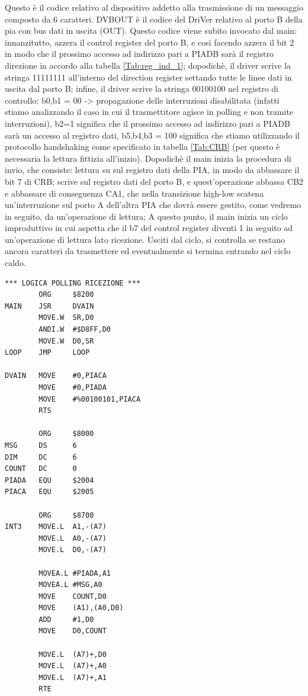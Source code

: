 Questo è il codice relativo al dispositivo addetto alla trasmissione di un messaggio composto da 6 caratteri. 
DVBOUT è il codice del DriVer relativo al porto B della pia con bus dati in uscita (OUT). Questo codice viene subito invocato dal main: innanzitutto, azzera il control register del porto B, e così facendo azzera il bit 2 in modo che il prossimo accesso ad indirizzo pari a PIADB sarà il registro direzione in accordo alla tabella \ref{Tab:reg_ind_1}; dopodichè, il driver scrive la stringa 11111111 all'interno del direction register settando tutte le linee dati in uscita dal porto B; infine, il driver scrive la stringa 00100100 nel registro di controllo: b0,b1 = 00 -> propagazione delle interruzioni disabilitata (infatti stiamo analizzando il caso in cui il trasmettitore agisce in polling e non tramite interruzioni), b2=1 significa che il prossimo accesso ad indirizzo pari a PIADB sarà un accesso al registro dati, b5,b4,b3 = 100 significa che stiamo utilizzando il protocollo handshaking come specificato in tabella \ref{Tab:CRB} (per questo è necessaria la lettura fittizia all'inizio).
Dopodichè il main inizia la procedura di invio, che consiste:
lettura su sul registro dati della PIA, in modo da abbassare il bit 7 di CRB; scrive sul registro dati del porto B, e quest'operazione abbassa CB2 e abbassare di conseguenza CA1, che nella transizione high-low scatena un'interruzione sul porto A dell'altra PIA che dovrà essere gestito, come vedremo in seguito, da un'operazione di lettura; A questo punto, il main inizia un ciclo improduttivo in cui aspetta che il b7 del control register diventi 1 in seguito ad un'operazione di lettura lato ricezione. 
Usciti dal ciclo, si controlla se restano ancora caratteri da trasmettere ed eventualmente si termina entrando nel ciclo caldo. 

\begin{lstlisting}
*** LOGICA POLLING RICEZIONE *** 
        ORG     $8200
MAIN    JSR     DVAIN 
        MOVE.W  SR,D0
        ANDI.W  #$D8FF,D0 
        MOVE.W  D0,SR 
LOOP    JMP     LOOP 

DVAIN   MOVE    #0,PIACA
        MOVE    #0,PIADA 
        MOVE    #%00100101,PIACA
        RTS

        ORG     $8000
MSG     DS      6
DIM     DC      6
COUNT   DC      0
PIADA   EQU     $2004
PIACA   EQU     $2005

        ORG     $8700
INT3    MOVE.L  A1,-(A7)
        MOVE.L  A0,-(A7)
        MOVE.L  D0,-(A7)

        MOVEA.L #PIADA,A1
        MOVEA.L #MSG,A0 
        MOVE    COUNT,D0 
        MOVE    (A1),(A0,D0)
        ADD     #1,D0 
        MOVE    D0,COUNT

        MOVE.L  (A7)+,D0
        MOVE.L  (A7)+,A0 
        MOVE.L  (A7)+,A1
        RTE 
\end{lstlisting}

